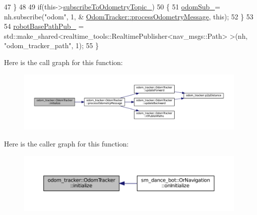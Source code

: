 \begin{DoxyCode}
47     \}
48 
49     \textcolor{keywordflow}{if}(this->\hyperlink{classodom__tracker_1_1OdomTracker_ae8ddf26c78b4bb30b162d30721d761f6}{subscribeToOdometryTopic\_})
50     \{
51         \hyperlink{classodom__tracker_1_1OdomTracker_a186753d1ad08b52714312a124d62029f}{odomSub\_}= nh.subscribe(\textcolor{stringliteral}{"odom"}, 1, &
      \hyperlink{classodom__tracker_1_1OdomTracker_a90cf5e7b0de712b88e86966c29ab79ef}{OdomTracker::processOdometryMessage}, \textcolor{keyword}{this});
52     \}
53 
54     \hyperlink{classodom__tracker_1_1OdomTracker_a53e20a1b81ef82bf4c736d554e77a828}{robotBasePathPub\_} = std::make\_shared<realtime\_tools::RealtimePublisher<nav\_msgs::Path>
      >(nh, \textcolor{stringliteral}{"odom\_tracker\_path"}, 1);
55 \}
\end{DoxyCode}


Here is the call graph for this function\+:
\nopagebreak
\begin{figure}[H]
\begin{center}
\leavevmode
\includegraphics[width=350pt]{classodom__tracker_1_1OdomTracker_a4442b3d434ea81dcfeb22331f01d9db7_cgraph}
\end{center}
\end{figure}




Here is the caller graph for this function\+:
\nopagebreak
\begin{figure}[H]
\begin{center}
\leavevmode
\includegraphics[width=350pt]{classodom__tracker_1_1OdomTracker_a4442b3d434ea81dcfeb22331f01d9db7_icgraph}
\end{center}
\end{figure}


